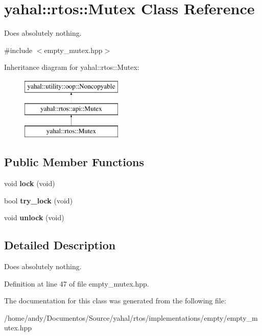 \hypertarget{classyahal_1_1rtos_1_1_mutex}{}\section{yahal\+:\+:rtos\+:\+:Mutex Class Reference}
\label{classyahal_1_1rtos_1_1_mutex}


Does absolutely nothing.  




{\ttfamily \#include $<$empty\+\_\+mutex.\+hpp$>$}

Inheritance diagram for yahal\+:\+:rtos\+:\+:Mutex\+:\begin{figure}[H]
\begin{center}
\leavevmode
\includegraphics[height=3.000000cm]{classyahal_1_1rtos_1_1_mutex}
\end{center}
\end{figure}
\subsection*{Public Member Functions}
\begin{DoxyCompactItemize}
\item 
\hypertarget{classyahal_1_1rtos_1_1_mutex_a43df7d0b3e52ab1dc78474bc63dbe67f}{}void {\bfseries lock} (void)\label{classyahal_1_1rtos_1_1_mutex_a43df7d0b3e52ab1dc78474bc63dbe67f}

\item 
\hypertarget{classyahal_1_1rtos_1_1_mutex_a7f5d68e7c4941f8be08a11b3d6ecf0e8}{}bool {\bfseries try\+\_\+lock} (void)\label{classyahal_1_1rtos_1_1_mutex_a7f5d68e7c4941f8be08a11b3d6ecf0e8}

\item 
\hypertarget{classyahal_1_1rtos_1_1_mutex_a34569c57fc1d2366560f588d6e451a46}{}void {\bfseries unlock} (void)\label{classyahal_1_1rtos_1_1_mutex_a34569c57fc1d2366560f588d6e451a46}

\end{DoxyCompactItemize}


\subsection{Detailed Description}
Does absolutely nothing. 

Definition at line 47 of file empty\+\_\+mutex.\+hpp.



The documentation for this class was generated from the following file\+:\begin{DoxyCompactItemize}
\item 
/home/andy/\+Documentos/\+Source/yahal/rtos/implementations/empty/empty\+\_\+mutex.\+hpp\end{DoxyCompactItemize}
